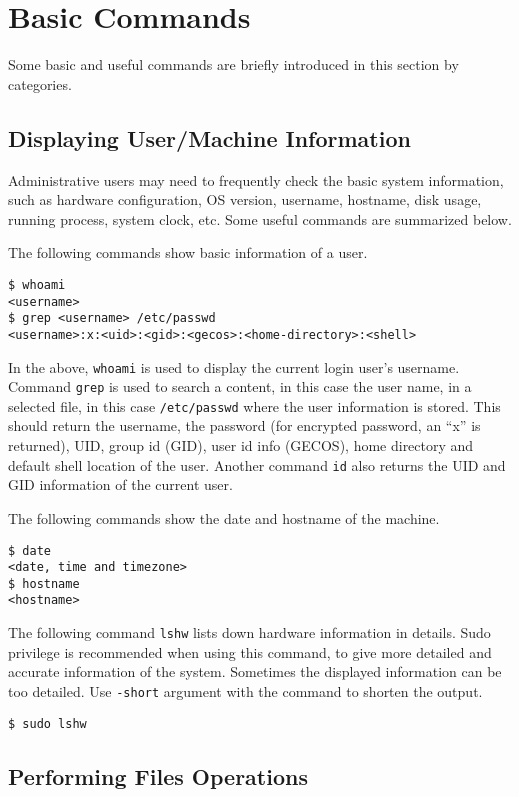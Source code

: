 \section{Basic Commands}

Some basic and useful commands are briefly introduced in this section by categories.

\subsection{Displaying User/Machine Information}

Administrative users may need to frequently check the basic system information, such as hardware configuration, OS version, username, hostname, disk usage, running process, system clock, etc. Some useful commands are summarized below.

The following commands show basic information of a user.
\begin{lstlisting}
$ whoami
<username>
$ grep <username> /etc/passwd
<username>:x:<uid>:<gid>:<gecos>:<home-directory>:<shell>
\end{lstlisting}
In the above, \verb|whoami| is used to display the current login user's username. Command \verb|grep| is used to search a content, in this case the user name, in a selected file, in this case \verb|/etc/passwd| where the user information is stored. This should return the username, the password (for encrypted password, an ``x'' is returned), UID, group id (GID), user id info (GECOS), home directory and default shell location of the user.
Another command \verb|id| also returns the UID and GID information of the current user.

The following commands show the date and hostname of the machine.
\begin{lstlisting}
$ date
<date, time and timezone>
$ hostname
<hostname>
\end{lstlisting}

The following command \verb|lshw| lists down hardware information in details. Sudo privilege is recommended when using this command, to give more detailed and accurate information of the system. Sometimes the displayed information can be too detailed. Use \verb|-short| argument with the command to shorten the output.
\begin{lstlisting}
$ sudo lshw
\end{lstlisting}

\subsection{Performing Files Operations}

